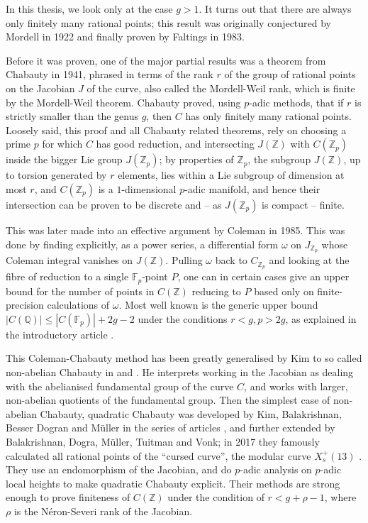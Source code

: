 \documentclass[12pt]{article}
\newcommand{\Z}{\mathbb{Z}}
\newcommand{\Q}{\mathbb{Q}}
\newcommand{\F}{\mathbb{F}}
\theoremstyle{plain}
\theoremstyle{definition}
\theoremstyle{remark}
\begin{document}
In this thesis, we look only at the case $g > 1$. It turns out that there are always only finitely many rational points; this result was originally conjectured by Mordell in 1922 and finally proven by Faltings in 1983.

Before it was proven, one of the major partial results was a theorem from Chabauty in 1941, phrased in terms of the rank $r$ of the group of rational points on the Jacobian $J$ of the curve, also called the Mordell-Weil rank, which is finite by the Mordell-Weil theorem. Chabauty proved, using $p$-adic methods, that if $r$ is strictly smaller than the genus $g$, then $C$ has only finitely many rational points. Loosely said, this proof and all Chabauty related theorems, rely on choosing a prime $p$ for which $C$ has good reduction, and intersecting $J(\Z)$ with $C(\Z_p)$ inside the bigger Lie group $J(\Z_p)$; by properties of $\Z_p$, the subgroup $J(\Z)$, up to torsion generated by $r$ elements, lies within a Lie subgroup of dimension at most $r$, and $C(\Z_p)$ is a $1$-dimensional $p$-adic manifold, and hence their intersection can be proven to be discrete and -- as $J(\Z_p)$ is compact -- finite.\todo{Ik moet volgens mij uberhaupt nadenken wat over $\Q,\Q_p,\Z,\Z_p$ moet}

This was later made into an effective argument by Coleman in 1985. This was done by finding explicitly, as a power series, a differential form $\omega$ on $J_{\Z_p}$ whose Coleman integral vanishes on $J(\Z)$. Pulling $\omega$ back to $C_{\Z_p}$ and looking at the fibre of reduction to a single $\F_p$-point $P$, one can in certain cases give an upper bound for the number of points in $C(\Z)$ reducing to $P$ based only on finite-precision calculations of $\omega$. Most well known is the generic upper bound $|C(\Q)| \leq |C(\F_p)| + 2g-2$ under the conditions $r < g, p > 2g$, as explained in the introductory article \cite{poonen12}.

This Coleman-Chabauty method has been greatly generalised by Kim to so called non-abelian Chabauty in  and . He interprets working in the Jacobian as dealing with the abelianised fundamental group of the curve $C$, and works with larger, non-abelian quotients of the fundamental group. Then the simplest case of non-abelian Chabauty, quadratic Chabauty was developed by Kim, Balakrishnan, Besser Dogran and M\"uller in the series of articles , and further extended by Balakrishnan, Dogra, M\"uller, Tuitman and Vonk; in 2017 they famously calculated  all rational points of the ``cursed curve'', the modular curve $X_s^+(13)$ \cite{cursedcurve}. They use an endomorphism of the Jacobian, and do $p$-adic analysis on $p$-adic local heights to make quadratic Chabauty explicit. Their methods are strong enough to prove finiteness of $C(\Z)$ under the condition of $r < g + \rho - 1$, where $\rho$ is the N\'eron-Severi rank of the Jacobian.
\end{document}

